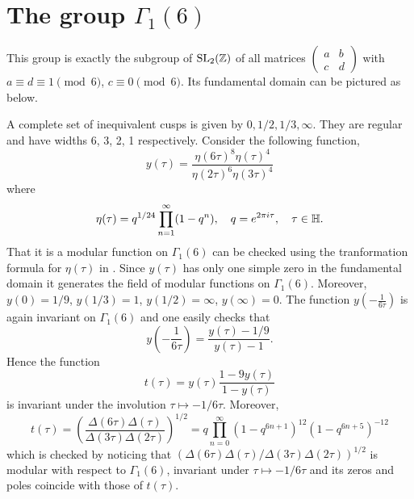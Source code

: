 \section{The group $\Gamma_1(6)$}

This group is exactly the subgroup of $\mathrm{SL}_2(\mathbb{Z})$ of all matrices $(\begin{smallmatrix}
    a & b \\ c & d
\end{smallmatrix})$ with $a \equiv d \equiv 1 \pmod{6}$, $c \equiv 0 \pmod{6}$.
Its fundamental domain can be pictured as below.

\begin{center}
\end{center}
A complete set of inequivalent cusps is given by $0, 1/2, 1/3, \infty$.
They are regular and have widths 6, 3, 2, 1 respectively.
Consider the following function,
$$
    y(\tau) = \frac{\eta(6\tau)^8 \eta(\tau)^4}{\eta(2\tau)^6 \eta(3\tau)^4}
$$
where
$$
    \eta(\tau) = q^{1/24} \prod_{n=1}^{\infty} (1 - q^n), \quad q = e^{2\pi i \tau}, \quad \tau \in \mathbb{H}.
$$
That it is a modular function on $\Gamma_1(6)$ can be checked using the tranformation formula for $\eta(\tau)$ in \cite[Ch 9]{rademacher2012topics}.
Since $y(\tau)$ has only one simple zero in the fundamental domain it generates the field of modular functions on $\Gamma_1(6)$.
Moreover, $y(0) = 1/9$, $y(1/3) = 1$, $y(1/2) = \infty$, $y(\infty) = 0$.
The function $y(-\frac{1}{6\tau})$ is again invariant on $\Gamma_1(6)$ and one easily checks that
\begin{equation}
    \label{eqn:1}
    y\left(-\frac{1}{6\tau}\right) = \frac{y(\tau) - 1/9}{y(\tau) - 1}.
\end{equation}
Hence the function
$$
    t(\tau) = y(\tau) \frac{1 - 9y(\tau)}{1 - y(\tau)}
$$
is invariant under the involution $\tau \mapsto -1/6\tau$.
Moreover,
$$
    t(\tau) = \left(\frac{\Delta(6\tau) \Delta(\tau)}{\Delta(3\tau) \Delta(2\tau)}\right)^{1/2} = q \prod_{n = 0}^{\infty} (1 - q^{6n + 1})^{12} (1 - q^{6n + 5})^{-12}
$$
which is checked by noticing that $(\Delta(6\tau) \Delta(\tau) / \Delta(3\tau) \Delta(2\tau))^{1/2}$ is modular with respect to $\Gamma_1(6)$, invariant under $\tau \mapsto -1/6\tau$ and its zeros and poles coincide with those of $t(\tau)$.

